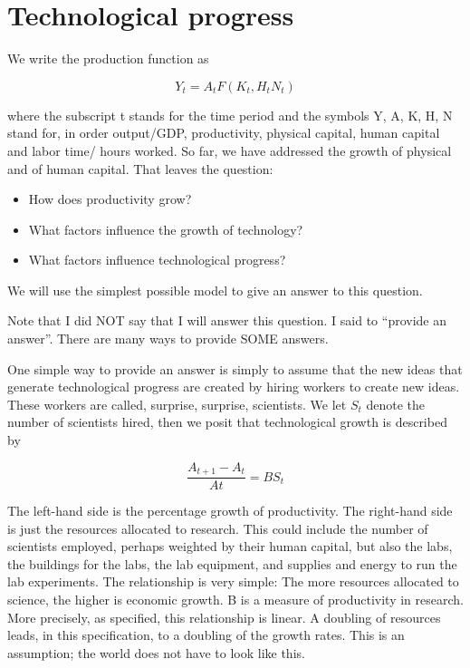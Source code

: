 \documentclass[
]{book}
\providecommand{\tightlist}{%
  \setlength{\itemsep}{0pt}\setlength{\parskip}{0pt}}
\begin{document}
\hypertarget{technological-progress}{%
\section{Technological progress}\label{technological-progress}}

We write the production function as

\[Y_t  =  A_t F( K_t, H_tN_t)\]

where the subscript t stands for the time period and the symbols Y, A, K, H, N stand for, in order output/GDP, productivity, physical capital, human capital and labor time/ hours worked. So far, we have addressed the growth of physical and of human capital. That leaves the question:

\begin{itemize}
\tightlist
\item
  How does productivity grow?
\item
  What factors influence the growth of technology?
\item
  What factors influence technological progress?
\end{itemize}

We will use the simplest possible model to give an answer to this question.

Note that I did NOT say that I will answer this question. I said to ``provide an answer''. There are many ways to provide SOME answers.

One simple way to provide an answer is simply to assume that the new ideas that generate technological progress are created by hiring workers to create new ideas. These workers are called, surprise, surprise, scientists. We let \(S_t\) denote the number of scientists hired, then we posit that technological growth is described by

\[ \frac{A_{t+1} - A_t}{At}  =  B S_t \]

The left-hand side is the percentage growth of productivity. The right-hand side is just the resources allocated to research. This could include the number of scientists employed, perhaps weighted by their human capital, but also the labs, the buildings for the labs, the lab equipment, and supplies and energy to run the lab experiments. The relationship is very simple: The more resources allocated to science, the higher is economic growth. B is a measure of productivity in research. More precisely, as specified, this relationship is linear. A doubling of resources leads, in this specification, to a doubling of the growth rates. This is an assumption; the world does not have to look like this.
\end{document}
